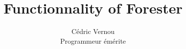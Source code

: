 \documentclass[11pt]{article}
\begin{document}
\title{Functionnality of Forester}
\author{Cédric Vernou\\
Programmeur émérite}

\maketitle
\tableofcontents
\newpage






\printglossaries



\end{document}
